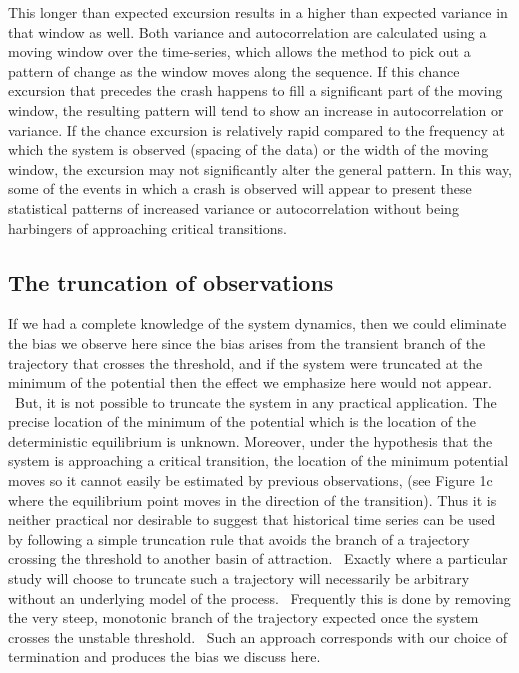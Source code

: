 \documentclass[authoryear,review,12pt]{elsarticle}
\begin{document}
This longer than expected excursion results in a higher than expected
variance in that window as well. Both variance and autocorrelation are
calculated using a moving window over the time-series, which allows
the method to pick out a pattern of change as the window moves along
the sequence. If this chance excursion that precedes the crash happens
to fill a significant part of the moving window, the resulting pattern
will tend to show an increase in autocorrelation or variance.  If the
chance excursion is relatively rapid compared to the frequency at which
the system is observed (spacing of the data) or the width of the moving
window, the excursion may not significantly alter the general pattern.
In this way, some of the events in which a crash is observed will
appear to present these statistical patterns of increased variance
or autocorrelation without being harbingers of approaching critical
transitions.


\subsection{ The truncation of observations }

If we had a complete knowledge of the system dynamics, then we could
eliminate the bias we observe here since the bias arises from the
transient branch of the trajectory that crosses the threshold, and
if the system were truncated at the minimum of the potential then the
effect we emphasize here would not appear.  But, it is not possible to
truncate the system in any practical application. The precise location of
the minimum of the potential which is the location of the deterministic
equilibrium is unknown. Moreover, under the hypothesis that the system is
approaching a critical transition, the location of the minimum potential
moves so it cannot easily be estimated by previous observations, (see
Figure 1c where the equilibrium point moves in the direction of the
transition). Thus it is neither practical nor desirable to suggest that
historical time series can be used by following a simple truncation rule
that avoids the branch of a trajectory crossing the threshold to another
basin of attraction.  Exactly where a particular study will choose
to truncate such a trajectory will necessarily be arbitrary without an
underlying model of the process.  Frequently this is done by removing
the very steep, monotonic branch of the trajectory expected once the
system crosses the unstable threshold.  Such an approach corresponds
with our choice of termination and produces the bias we discuss here.
\end{document}
